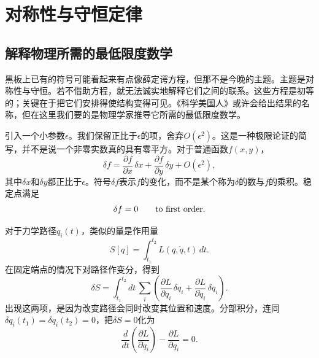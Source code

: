 \chapter{对称性与守恒定律}


\section{解释物理所需的最低限度数学}

黑板上已有的符号可能看起来有点像薛定谔方程，但那不是今晚的主题。主题是对称性与守恒。若不借助方程，就无法诚实地解释它们之间的联系。这些方程是初等的；关键在于把它们安排得使结构变得可见。《科学美国人》或许会给出结果的名称，但在这里我们要的是物理学家推导它所需的最低限度数学。

引入一个小参数\(\epsilon\)。我们保留正比于\(\epsilon\)的项，舍弃\(O(\epsilon^2)\)。这是一种极限论证的简写，并不是说一个非零实数真的具有零平方。对于普通函数\(f(x,y)\)，
\begin{equation}
  \delta f
  =\frac{\partial f}{\partial x}\,\delta x
   +\frac{\partial f}{\partial y}\,\delta y
   +O(\epsilon^2),
  \label{eq:first-variation-f}
\end{equation}
其中\(\delta x\)和\(\delta y\)都正比于\(\epsilon\)。符号\(\delta f\)表示\(f\)的变化，而不是某个称为\(\delta\)的数与\(f\)的乘积。稳定点满足
\begin{equation}
  \delta f=0
  \qquad\hbox{to first order.}
  \label{eq:stationary-f}
\end{equation}

对于力学路径\(q_i(t)\)，类似的量是作用量
\begin{equation}
  S[q]=\int_{t_1}^{t_2}L(q,\dot q,t)\,dt.
  \label{eq:action-l4}
\end{equation}
在固定端点的情况下对路径作变分，得到
\begin{equation}
  \delta S
  =\int_{t_1}^{t_2}dt\,
   \sum_i\left(
     \frac{\partial L}{\partial q_i}\,\delta q_i
     +\frac{\partial L}{\partial\dot q_i}\,\delta\dot q_i
   \right).
  \label{eq:action-variation-l4}
\end{equation}
出现这两项，是因为改变路径会同时改变其位置和速度。分部积分，连同
\(\delta q_i(t_1)=\delta q_i(t_2)=0\)，把\(\delta S=0\)化为
\begin{equation}
  \frac{d}{dt}\left(\frac{\partial L}{\partial\dot q_i}\right)
  -\frac{\partial L}{\partial q_i}=0.
  \label{eq:el-l4}
\end{equation}

